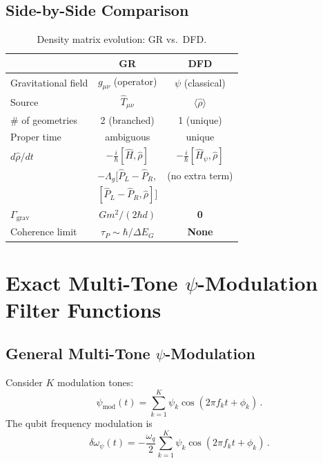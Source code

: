\documentclass[aps,prl,twocolumn,superscriptaddress,nofootinbib,longbibliography]{revtex4-2}
\begin{document}
\subsection{Side-by-Side Comparison}

\begin{table}[h]
\caption{Density matrix evolution: GR vs.\ DFD.}
\label{tab:GR-vs-DFD}
\begin{ruledtabular}
\begin{tabular}{lcc}
& \textbf{GR} & \textbf{DFD} \\
\hline
Gravitational field & $g_{\mu\nu}$ (operator) & $\psi$ (classical) \\
Source & $\hat{T}_{\mu\nu}$ & $\langle\hat{\rho}\rangle$ \\
\# of geometries & 2 (branched) & 1 (unique) \\
Proper time & ambiguous & unique \\
\hline
$d\hat{\rho}/dt$ & $-\frac{i}{\hbar}[\hat{H},\hat{\rho}]$ &
$-\frac{i}{\hbar}[\hat{H}_\psi,\hat{\rho}]$ \\
& $-\Lambda_g[\hat{P}_L{-}\hat{P}_R,$ & (no extra term) \\
& $[\hat{P}_L{-}\hat{P}_R,\hat{\rho}]]$ & \\
\hline
$\Gamma_{\text{grav}}$ & $Gm^2/(2\hbar d)$ & \textbf{0} \\
\hline
Coherence limit & $\tau_P \sim \hbar/\Delta E_G$ & \textbf{None} \\
\end{tabular}
\end{ruledtabular}
\end{table}

\section{Exact Multi-Tone $\psi$-Modulation Filter Functions}
\label{sec:filter}

\subsection{General Multi-Tone $\psi$-Modulation}

Consider $K$ modulation tones:
\begin{equation}\label{eq:multi-tone}
\psi_{\text{mod}}(t) = \sum_{k=1}^{K} \psi_k\cos(2\pi f_k t + \phi_k)\,.
\end{equation}
The qubit frequency modulation is
\begin{equation}
\delta\omega_\psi(t) = -\frac{\omega_q}{2}\sum_{k=1}^K
\psi_k\cos(2\pi f_k t + \phi_k)\,.
\end{equation}
\end{document}
